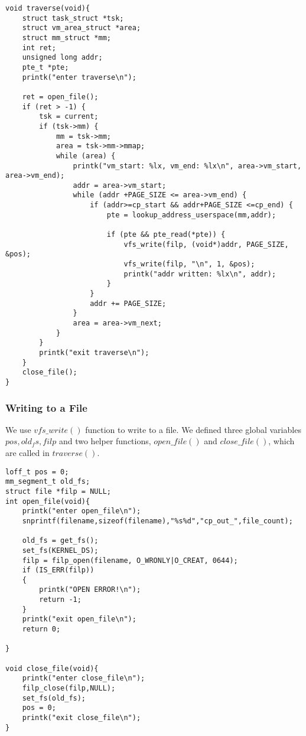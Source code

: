 \documentclass[11pt]{article}
\begin{document}
\begin{lstlisting}[style=CStyle]
void traverse(void){
    struct task_struct *tsk;
    struct vm_area_struct *area;
    struct mm_struct *mm;
    int ret;
    unsigned long addr;
    pte_t *pte;
    printk("enter traverse\n");

    ret = open_file();
    if (ret > -1) {
        tsk = current;
        if (tsk->mm) {
            mm = tsk->mm;
            area = tsk->mm->mmap;
            while (area) {
                printk("vm_start: %lx, vm_end: %lx\n", area->vm_start, area->vm_end);        
                addr = area->vm_start;
                while (addr +PAGE_SIZE <= area->vm_end) {
                    if (addr>=cp_start && addr+PAGE_SIZE <=cp_end) {
                        pte = lookup_address_userspace(mm,addr);
                                                               
                        if (pte && pte_read(*pte)) {
                            vfs_write(filp, (void*)addr, PAGE_SIZE, &pos);
                            vfs_write(filp, "\n", 1, &pos);
                            printk("addr written: %lx\n", addr);
                        }
                    }
                    addr += PAGE_SIZE;
                }
                area = area->vm_next;
            }
        }
        printk("exit traverse\n");
    }
    close_file();
}

\end{lstlisting}


\subsubsection{Writing to a File}
We use $vfs\_write()$ function to write to a file. We defined three global variables $pos, old_fs, filp$ and two helper functions, $open\_file()$ and $close\_file()$, which are called in $traverse()$. 

\begin{lstlisting}[style=CStyle]
loff_t pos = 0;
mm_segment_t old_fs;
struct file *filp = NULL;
int open_file(void){
    printk("enter open_file\n");
    snprintf(filename,sizeof(filename),"%s%d","cp_out_",file_count);
                
    old_fs = get_fs();
    set_fs(KERNEL_DS);
    filp = filp_open(filename, O_WRONLY|O_CREAT, 0644);
    if (IS_ERR(filp))
    {
        printk("OPEN ERROR!\n");
        return -1;
    }   
    printk("exit open_file\n");
    return 0;
                                        
}

void close_file(void){
    printk("enter close_file\n");
    filp_close(filp,NULL);
    set_fs(old_fs);
    pos = 0;
    printk("exit close_file\n");
}
\end{lstlisting}
\end{document}
